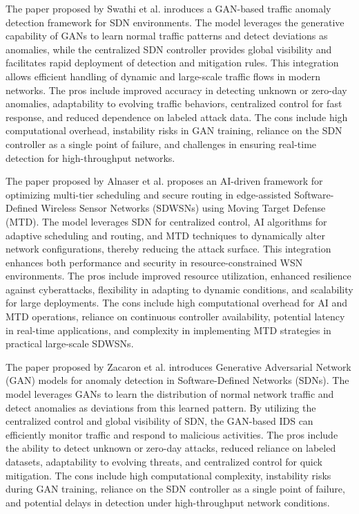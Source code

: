 \documentclass[a4paper,fleqn]{cas-dc}
\numberwithin{equation}{section}
\begin{document}
The paper proposed by Swathi et al.\cite{Swathi202410653} inroduces a GAN-based traffic anomaly detection framework for SDN environments. The model leverages the generative capability of GANs to learn normal traffic patterns and detect deviations as anomalies, while the centralized SDN controller provides global visibility and facilitates rapid deployment of detection and mitigation rules. This integration allows efficient handling of dynamic and large-scale traffic flows in modern networks. The pros include improved accuracy in detecting unknown or zero-day anomalies, adaptability to evolving traffic behaviors, centralized control for fast response, and reduced dependence on labeled attack data. The cons include high computational overhead, instability risks in GAN training, reliance on the SDN controller as a single point of failure, and challenges in ensuring real-time detection for high-throughput networks.

The paper proposed by Alnaser et al.\cite{Alnaser2024} proposes an AI-driven framework for optimizing multi-tier scheduling and secure routing in edge-assisted Software-Defined Wireless Sensor Networks (SDWSNs) using Moving Target Defense (MTD). The model leverages SDN for centralized control, AI algorithms for adaptive scheduling and routing, and MTD techniques to dynamically alter network configurations, thereby reducing the attack surface. This integration enhances both performance and security in resource-constrained WSN environments. The pros include improved resource utilization, enhanced resilience against cyberattacks, flexibility in adapting to dynamic conditions, and scalability for large deployments. The cons include high computational overhead for AI and MTD operations, reliance on continuous controller availability, potential latency in real-time applications, and complexity in implementing MTD strategies in practical large-scale SDWSNs.

The paper proposed by Zacaron et al.\cite{Zacaron2024} introduces Generative Adversarial Network (GAN) models for anomaly detection in Software-Defined Networks (SDNs). The model leverages GANs to learn the distribution of normal network traffic and detect anomalies as deviations from this learned pattern. By utilizing the centralized control and global visibility of SDN, the GAN-based IDS can efficiently monitor traffic and respond to malicious activities. The pros include the ability to detect unknown or zero-day attacks, reduced reliance on labeled datasets, adaptability to evolving threats, and centralized control for quick mitigation. The cons include high computational complexity, instability risks during GAN training, reliance on the SDN controller as a single point of failure, and potential delays in detection under high-throughput network conditions.
\end{document}
